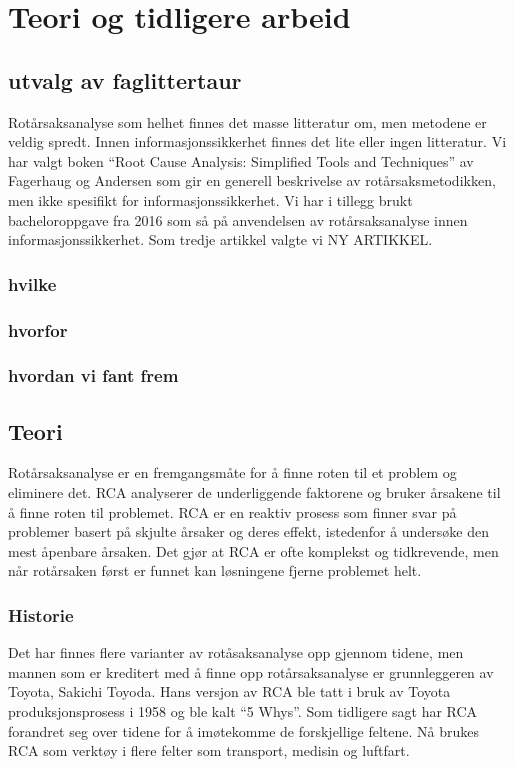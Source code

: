 \chapter{Teori og tidligere arbeid}
\label{kap:teori}

\section{utvalg av faglittertaur}
Rotårsaksanalyse som helhet finnes det masse litteratur om, men metodene er veldig spredt. Innen informasjonssikkerhet finnes det lite eller ingen litteratur. Vi har valgt boken ``Root Cause Analysis: Simplified Tools and Techniques'' av Fagerhaug og Andersen \cite{RCA} som gir en generell beskrivelse av rotårsaksmetodikken, men ikke spesifikt for informasjonssikkerhet. Vi har i tillegg brukt bacheloroppgave fra 2016 som så på anvendelsen av rotårsaksanalyse innen informasjonssikkerhet. Som tredje artikkel valgte vi NY ARTIKKEL. 
\subsection{hvilke}

\subsection{hvorfor}

\subsection{hvordan vi fant frem}


\section{Teori}
Rotårsaksanalyse er en fremgangsmåte for å finne roten til et problem og eliminere det. RCA analyserer de underliggende faktorene og bruker årsakene til å finne roten til problemet. RCA er en reaktiv prosess som finner svar på problemer basert på skjulte årsaker og deres effekt, istedenfor å undersøke den mest åpenbare årsaken. Det gjør at RCA er ofte komplekst og tidkrevende, men når rotårsaken først er funnet kan løsningene fjerne problemet helt. 

\subsection{Historie}
Det har finnes flere varianter av rotåsaksanalyse opp gjennom tidene, men mannen som er kreditert med å finne opp rotårsaksanalyse er grunnleggeren av Toyota, Sakichi Toyoda. Hans versjon av RCA ble tatt i bruk av Toyota produksjonsprosess i 1958 og ble kalt ``5 Whys''. Som tidligere sagt har RCA forandret seg over tidene for å imøtekomme de forskjellige feltene. Nå brukes RCA som verktøy i flere felter som transport, medisin og luftfart. %
    

